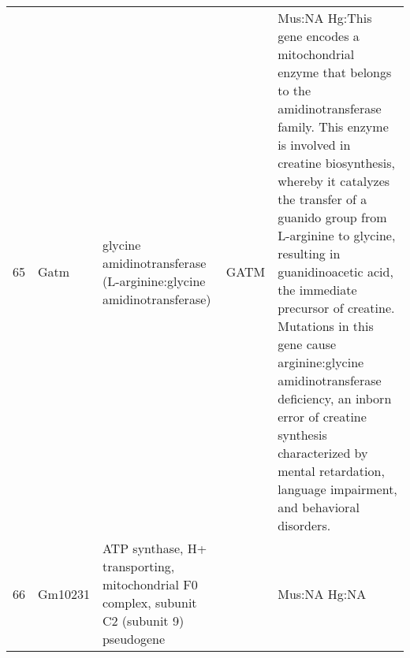 \documentclass[11pt, landscape]{article}   	%
\begin{document}
\begin{table}[ht]
\begin{tabular}{rlp{3cm}lp{12cm}}
  65 & Gatm & glycine amidinotransferase (L-arginine:glycine amidinotransferase) & GATM & Mus:NA Hg:This gene encodes a mitochondrial enzyme that belongs to the amidinotransferase family. This enzyme is involved in creatine biosynthesis, whereby it catalyzes the transfer of a guanido group from L-arginine to glycine, resulting in guanidinoacetic acid, the immediate precursor of creatine. Mutations in this gene cause arginine:glycine amidinotransferase deficiency, an inborn error of creatine synthesis characterized by mental retardation, language impairment, and behavioral disorders. \\ 
  66 & Gm10231 & ATP synthase, H+ transporting, mitochondrial F0 complex, subunit C2 (subunit 9) pseudogene &  & Mus:NA Hg:NA \\ 

   \hline
\end{tabular}
\end{table}
\end{document}
